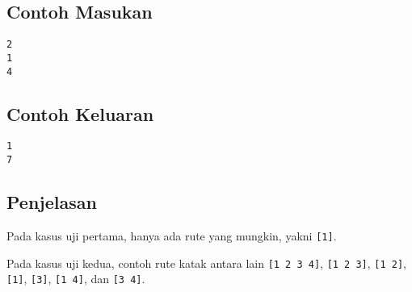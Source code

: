 \documentclass{article}
\begin{document}
\begin{multicols}{2}
\subsection*{Contoh Masukan}
\begin{lstlisting}
2
1
4
\end{lstlisting}
\columnbreak
\subsection*{Contoh Keluaran}
\begin{lstlisting}
1
7
\end{lstlisting}
\vfill
\null
\end{multicols}

\subsection*{Penjelasan}

Pada kasus uji pertama, hanya ada rute yang mungkin, yakni \lstinline{[1]}.

Pada kasus uji kedua, contoh rute katak antara lain \lstinline{[1 2 3 4]}, \lstinline{[1 2 3]}, \lstinline{[1 2]}, \lstinline{[1]}, \lstinline{[3]}, \lstinline{[1 4]}, dan \lstinline{[3 4]}.

\pagebreak
\end{document}
